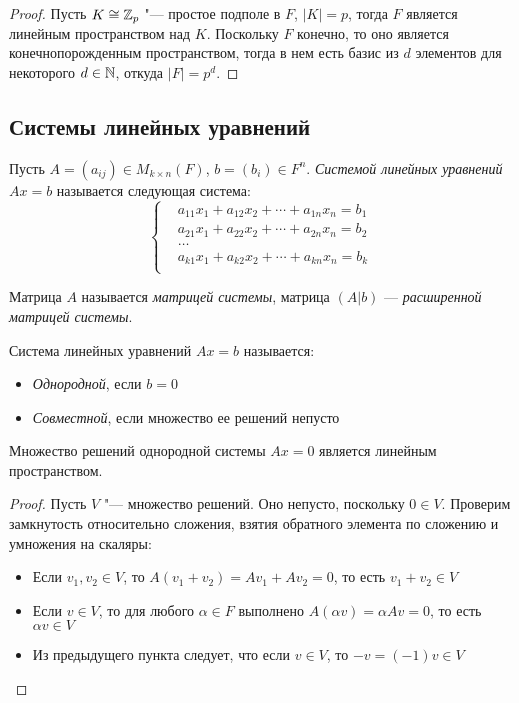 \begin{proof}
	Пусть $K \cong \mathbb{Z}_p$ "--- простое подполе в $F$, $|K| = p$, тогда $F$ является линейным пространством над $K$. Поскольку $F$ конечно, то оно является конечнопорожденным пространством, тогда в нем есть базис из $d$ элементов для некоторого $d \in \mathbb{N}$, откуда $|F| = p^d$.
\end{proof}

\subsection{Системы линейных уравнений}

\begin{definition}
	Пусть $A = (a_{ij}) \in M_{k \times n}(F)$, $b = (b_i) \in F^n$. \textit{Системой линейных уравнений} $Ax = b$ называется следующая система:
	\[
	\left\{
	\begin{aligned}
	&a_{11}x_1 + a_{12}x_2 + \dotsb + a_{1n}x_n = b_1\\
	&a_{21}x_1 + a_{22}x_2 + \dotsb + a_{2n}x_n = b_2\\
	&\dots\\
	&a_{k1}x_1 + a_{k2}x_2 + \dotsb + a_{kn}x_n = b_k\\
	\end{aligned}
	\right.
	\]
	
	Матрица $A$ называется \textit{матрицей системы}, матрица $(A|b)$ --- \textit{ расширенной матрицей системы}.
\end{definition}

\begin{definition}
	Система линейных уравнений $Ax = b$ называется:
	\begin{itemize}
		\item \textit{Однородной}, если $b = 0$
		\item \textit{Совместной}, если множество ее решений непусто
	\end{itemize} 
\end{definition}

\begin{proposition}
	Множество решений однородной системы $Ax = 0$ является линейным пространством.
\end{proposition}

\begin{proof}
	Пусть $V$ "--- множество решений. Оно непусто, поскольку $0 \in V$. \pagebreak Проверим замкнутость относительно сложения, взятия обратного элемента по сложению и умножения на скаляры:
	\begin{itemize}
		\item Если $v_1, v_2 \in V$, то $A(v_1 + v_2) = Av_1 + Av_2 = 0$, то есть $v_1 + v_2 \in V$
		\item Если $v \in V$, то для любого $\alpha \in F$ выполнено $A(\alpha v) = \alpha Av = 0$, то есть $\alpha v \in V$
		\item Из предыдущего пункта следует, что если $v \in V$, то $-v = (-1)v \in V$\qedhere
	\end{itemize}
\end{proof}

